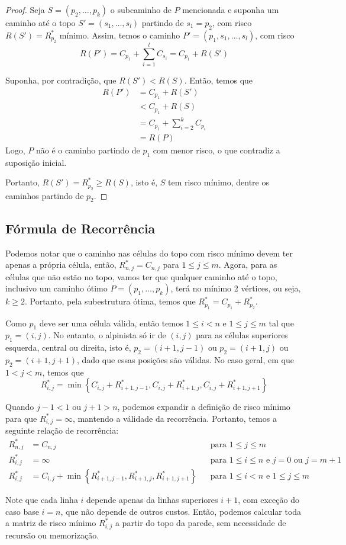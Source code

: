 \begin{proof}
    Seja $S = \left(p_2, \ldots, p_k\right)$ o subcaminho de $P$ mencionada e suponha um caminho até o topo $S' = \left(s_1, \ldots, s_l\right)$ partindo de $s_1 = p_2$, com risco $R(S') = R^*_{p_2}$ mínimo. Assim, temos o caminho $P' = \left(p_1, s_1, \ldots, s_l\right)$, com risco
    \[
        R(P') = C_{p_1} + \sum_{i = 1}^l C_{s_i} = C_{p_1} + R(S')
    \]

    Suponha, por contradição, que $R(S') < R(S)$. Então, temos que
    \begin{align*}
        R(P') &= C_{p_1} + R(S')  \\
            &< C_{p_1} + R(S) \\
            &= C_{p_1} + \sum_{i = 2}^{k} C_{p_i} \\
            &= R(P)
    \end{align*}
    Logo, $P$ não é o caminho partindo de $p_1$ com menor risco, o que contradiz a suposição inicial.

    Portanto, $R(S') = R^*_{p_2} \geq R(S)$, isto é, $S$ tem risco mínimo, dentre os caminhos partindo de $p_2$.
\end{proof}

\subsection{Fórmula de Recorrência}

Podemos notar que o caminho nas células do topo com risco mínimo devem ter apenas a própria célula, então, $R^*_{n, j} = C_{n, j}$  para $1 \leq j \leq m$. Agora, para as células que não estão no topo, vamos ter que qualquer caminho até o topo, inclusivo um caminho ótimo $P = \left(p_1, \ldots, p_k\right)$, terá no mínimo 2 vértices, ou seja, $k \geq 2$. Portanto, pela subestrutura ótima, temos que $R^*_{p_1} = C_{p_1} + R^*_{p_2}$.

Como $p_1$ deve ser uma célula válida, então temos $1 \leq i < n$ e $1 \leq j \leq m$ tal que $p_1 = (i, j)$. No entanto, o alpinista só ir de $(i, j)$ para as células superiores esquerda, central ou direita, isto é, $p_2 = (i+1, j-1)$ ou $p_2 = (i+1, j)$ ou $p_2 = (i+1, j+1)$, dado que essas posições são válidas. No caso geral, em que $1 < j < m$, temos que
\[
    R^*_{i, j} = \min\left\{C_{i, j} + R^*_{i+1,j-1}, C_{i, j} + R^*_{i+1,j}, C_{i, j} + R^*_{i+1,j+1}\right\}
\]

Quando $j - 1 < 1$ ou $j + 1 > n$, podemos expandir a definição de risco mínimo para que $R^*_{i, j} = \infty$, mantendo a válidade da recorrência. Portanto, temos a seguinte relação de recorrência:
\begin{align*}
    R^*_{n, j} &= C_{n, j} && \text{para $1 \leq j \leq m$}\\
    R^*_{i, j} &= \infty && \text{para $1 \leq i \leq n$ e $j = 0$ ou $j = m + 1$} \\
    R^*_{i, j} &= C_{i, j} + \min\left\{R^*_{i+1,j-1}, R^*_{i+1,j}, R^*_{i+1,j+1}\right\} && \text{para $1 \leq i < n$ e $1 \leq j \leq m$}
\end{align*}

Note que cada linha $i$ depende apenas da linhas superiores $i+1$, com exceção do caso base $i = n$, que não depende de outros custos. Então, podemos calcular toda a matriz de risco mínimo $R^*_{i, j}$ a partir do topo da parede, sem necessidade de recursão ou memorização.
